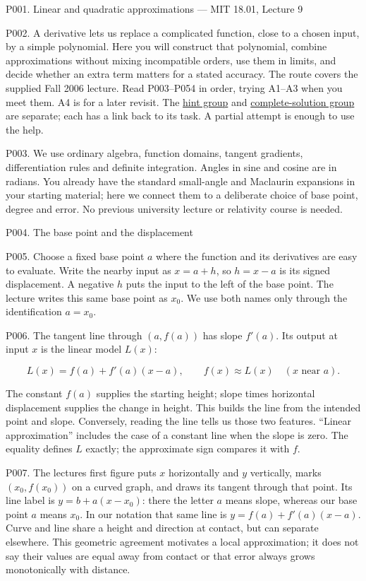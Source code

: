 \documentclass[
  11pt,
]{article}
\author{}
\date{}
\begin{document}
P001. Linear and quadratic approximations --- MIT 18.01, Lecture 9

P002. A derivative lets us replace a complicated function, close to a
chosen input, by a simple polynomial. Here you will construct that
polynomial, combine approximations without mixing incompatible orders,
use them in limits, and decide whether an extra term matters for a
stated accuracy. The route covers the supplied Fall 2006 lecture. Read
P003--P054 in order, trying A1--A3 when you meet them. A4 is for a later
revisit. The \protect\hyperlink{hints}{hint group} and
\protect\hyperlink{solutions}{complete-solution group} are separate;
each has a link back to its task. A partial attempt is enough to use the
help.

P003. We use ordinary algebra, function domains, tangent gradients,
differentiation rules and definite integration. Angles in sine and
cosine are in radians. You already have the standard small-angle and
Maclaurin expansions in your starting material; here we connect them to
a deliberate choice of base point, degree and error. No previous
university lecture or relativity course is needed.

P004. The base point and the displacement

P005. Choose a fixed base point \(a\) where the function and its
derivatives are easy to evaluate. Write the nearby input as \(x=a+h\),
so \(h=x-a\) is its signed displacement. A negative \(h\) puts the input
to the left of the base point. The lecture writes this same base point
as \(x_0\). We use both names only through the identification \(a=x_0\).

P006. The tangent line through \((a,f(a))\) has slope \(f'(a)\). Its
output at input \(x\) is the linear model \(L(x)\):

\[
L(x)=f(a)+f'(a)(x-a),\qquad f(x)\approx L(x)\quad(x\text{ near }a).
\]

The constant \(f(a)\) supplies the starting height; slope times
horizontal displacement supplies the change in height. This builds the
line from the intended point and slope. Conversely, reading the line
tells us those two features. ``Linear approximation'' includes the case
of a constant line when the slope is zero. The equality defines \(L\)
exactly; the approximate sign compares it with \(f\).

P007. The lecture\textquotesingle s first figure puts \(x\) horizontally
and \(y\) vertically, marks \((x_0,f(x_0))\) on a curved graph, and
draws its tangent through that point. Its line label is
\(y=b+a(x-x_0)\): there the letter \(a\) means slope, whereas our base
point \(a\) means \(x_0\). In our notation that same line is
\(y=f(a)+f'(a)(x-a)\). Curve and line share a height and direction at
contact, but can separate elsewhere. This geometric agreement motivates
a local approximation; it does not say their values are equal away from
contact or that error always grows monotonically with distance.
\end{document}
